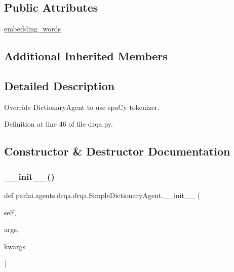 \subsection*{Public Attributes}
\begin{DoxyCompactItemize}
\item 
\hyperlink{classparlai_1_1agents_1_1drqa_1_1drqa_1_1SimpleDictionaryAgent_a26ce0c0cc3362b43219d488826c3550a}{embedding\+\_\+words}
\end{DoxyCompactItemize}
\subsection*{Additional Inherited Members}


\subsection{Detailed Description}
\begin{DoxyVerb}Override DictionaryAgent to use spaCy tokenizer.
\end{DoxyVerb}
 

Definition at line 46 of file drqa.\+py.



\subsection{Constructor \& Destructor Documentation}
\mbox{\label{classparlai_1_1agents_1_1drqa_1_1drqa_1_1SimpleDictionaryAgent_ae21eeff2d5a918998ca8ea90279c9b07}} 
\subsubsection{\texorpdfstring{\+\_\+\+\_\+init\+\_\+\+\_\+()}{\_\_init\_\_()}}
{\footnotesize\ttfamily def parlai.\+agents.\+drqa.\+drqa.\+Simple\+Dictionary\+Agent.\+\_\+\+\_\+init\+\_\+\+\_\+ (\begin{DoxyParamCaption}\item[{}]{self,  }\item[{}]{args,  }\item[{}]{kwargs }\end{DoxyParamCaption})}



